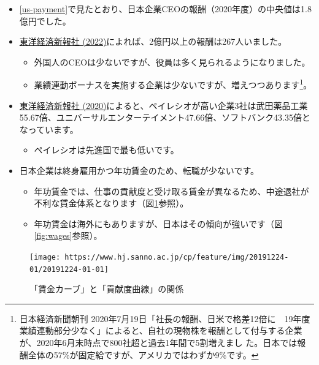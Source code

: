 \documentclass[
]{book}
\providecommand{\tightlist}{%
  \setlength{\itemsep}{0pt}\setlength{\parskip}{0pt}}
\begin{document}
\begin{itemize}
\item
  \ref{us-payment}で見たとおり、日本企業CEOの報酬（2020年度）の中央値は1.8億円でした。
\item
  \href{https://toyokeizai.net/articles/-/620775}{東洋経済新報社 (2022)}によれば、2億円以上の報酬は267人いました。

  \begin{itemize}
  \item
    外国人のCEOは少ないですが、役員は多く見られるようになりました。
  \item
    業績連動ボーナスを実施する企業は少ないですが、増えつつあります\footnote{日本経済新聞朝刊 2020年7月19日「社長の報酬、日米で格差12倍に　19年度　業績連動部分少なく」によると、自社の現物株を報酬として付与する企業が、2020年6月末時点で800社超と過去1年間で5割増えまし
      た。日本では報酬全体の57\%が固定給ですが、アメリカではわずか9\%です。}。
  \end{itemize}
\end{itemize}

\begin{itemize}
\item
  \href{https://toyokeizai.net/articles/-/397196}{東洋経済新報社 (2020)}によると、ペイレシオが高い企業3社は武田薬品工業55.67倍、ユニバーサルエンターテイメント47.66倍、ソフトバンク43.35倍となっています。

  \begin{itemize}
  \tightlist
  \item
    ペイレシオは先進国で最も低いです。
  \end{itemize}
\item
  日本企業は終身雇用かつ年功賃金のため、転職が少ないです。

  \begin{itemize}
  \item
    年功賃金では、仕事の貢献度と受け取る賃金が異なるため、中途退社が不利な賃金体系となります（図\ref{fig:jpwage}参照）。
  \item
    年功賃金は海外にもありますが、日本はその傾向が強いです（図\ref{fig:wages}参照）。
  \end{itemize}
\end{itemize}

\begin{figure}
\texttt{[image: https://www.hj.sanno.ac.jp/cp/feature/img/20191224-01/20191224-01-01]} \caption{「賃金カーブ」と「貢献度曲線」の関係}\label{fig:jpwage}
\end{figure}
\end{document}
